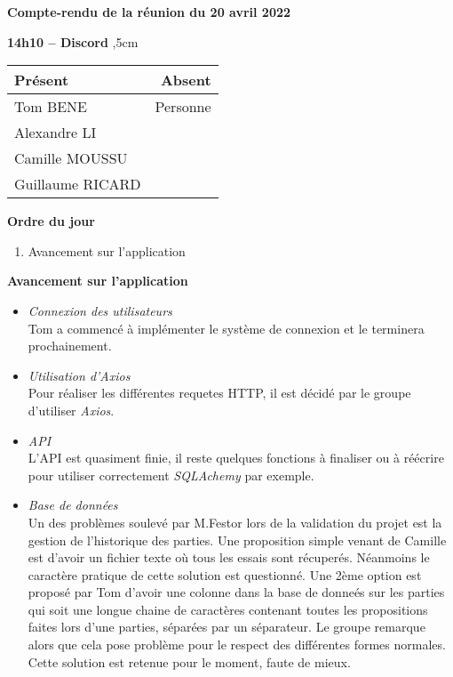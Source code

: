 \documentclass[12pt,a4paper,final]{report}
\begin{document}
\begin{center}
\Large \textbf{Compte-rendu de la réunion du 20 avril 2022}
\end{center}

\textbf{14h10 -- Discord}
,5cm

\begin{center}
\begin{tabular}{|l|r|}
    \hline
    Présent & Absent \\
    \hline
    Tom BENE & Personne \\
    Alexandre LI & \\
    Camille MOUSSU & \\
    Guillaume RICARD  & \\
    \hline
\end{tabular}
\end{center}

\begin{flushleft}
    \textbf{Ordre du jour}
\end{flushleft}

\begin{enumerate}
	\item Avancement sur l'application 
\end{enumerate}

\begin{flushleft}
    \textbf{Avancement sur l'application}
\end{flushleft}

\begin{itemize}
    \item \textit{Connexion des utilisateurs} \\
    Tom a commencé à implémenter le système de connexion et le terminera prochainement.
    \item \textit{Utilisation d'Axios} \\
    Pour réaliser les différentes requetes HTTP, il est décidé par le groupe d'utiliser \textit{Axios}. 
    \item \textit{API} \\
    L'API est quasiment finie, il reste quelques fonctions à finaliser ou à réécrire pour utiliser correctement \textit{SQLAchemy} par exemple. \\
    \item \textit{Base de données} \\
    Un des problèmes soulevé par M.Festor lors de la validation du projet est la gestion de l'historique des parties. Une proposition simple venant de Camille est d'avoir un fichier texte où tous les essais sont récuperés. Néanmoins le caractère pratique de cette solution est questionné. Une 2ème option est proposé par Tom d'avoir une colonne dans la base de donneés sur les parties qui soit une longue chaine de caractères contenant toutes les propositions faites lors d'une parties, séparées par un séparateur. Le groupe remarque alors que cela pose problème pour le respect des différentes formes normales. Cette solution est retenue pour le moment, faute de mieux. 
\end{itemize}
\end{document}
